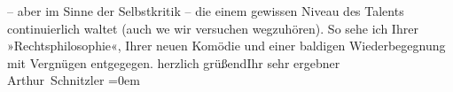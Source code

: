 \begin{ledgroupsized}[t]{13cm}
               – aber im Sinne der Selbstkritik – die einem gewissen Niveau des Talents
               continuierlich waltet (auch we{\geminationn} wir versuchen
               wegzuhören).\pend
           \pstart
           So sehe ich Ihrer »Rechtsphilosophie«, Ihrer
               neuen Komödie und einer baldigen Wiederbegegnung mit Vergnügen entgegegen.\pend
           \pstart
           herzlich grüßend\hspace*{1.5em}Ihr sehr ergebner{\\[\baselineskip]}\spacefill\mbox{Arthur Schnitzler}\pend
           \leftskip=0em{}
         
         \endnumbering{}\end{ledgroupsized}  \newcommand{\dateiname}{L02216}\newcommand{\titel}{Arthur Schnitzler an Robert Adam, 20. 7. 1915}\newcommand{\editorInnen}{Martin Anton Müller und Gerd-Hermann Susen}
      